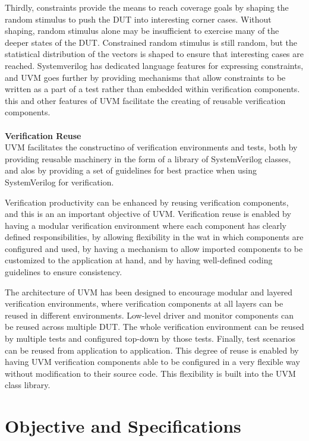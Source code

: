 \documentclass[a4paper,11pt]{article}
\begin{document}
Thirdly, constraints provide the means to reach coverage goals by shaping the random stimulus to push the DUT into interesting corner cases. Without shaping, random stimulus alone may be insufficient to exercise many of the deeper states of the DUT. Constrained random stimulus is still random, but the statistical distribution of the vectors is shaped to ensure that interesting cases are reached. Systemverilog has dedicated language features for expressing constraints, and UVM goes further by providing mechanisms that allow constraints to be written as a part of a test rather than embedded within verification components. this and other features of UVM facilitate the creating of reusable verification components.
\ \\
\ \\
\textbf{Verification Reuse}
\ \\
UVM facilitates the constructino of verification environments and tests, both by providing reusable machinery in the form of a library of SystemVerilog classes, and alos by providing a set of guidelines for best practice when using SystemVerilog for verification.

Verification productivity can be enhanced by reusing verification components, and this is an an important objective of UVM. Verification reuse is enabled by having a modular verification environment where each component has clearly defined responsibilities, by allowing flexibility in the wat in which components are configured and used, by having a mechanism to allow imported components to be customized to the application at hand, and by having well-defined coding guidelines to ensure consistency.

The architecture of UVM has been designed to encourage modular and layered verification environments, where verification components at all layers can be reused in different environments. Low-level driver and monitor components can be reused across multiple DUT. The whole verification environment can be reused by multiple tests and configured top-down by those tests. Finally, test scenarios can be reused from application to application. This degree of reuse is enabled by having UVM verification components able to be configured in a very flexible way without modification to their source code. This flexibility is built into the UVM class library.

\newpage
\pagebreak
\section{Objective and Specifications}
\end{document}
